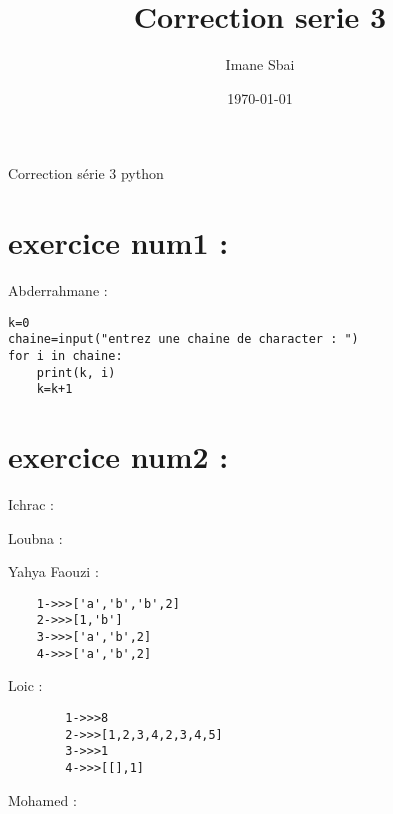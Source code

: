 \documentclass{article}
\title{Correction serie 3}
\author{Imane Sbai}
\date {\today}
\begin{document}
\begin{titlepage}
    \begin{center}
Correction s\'{e}rie 3 python
    \end{center}
\end{titlepage}

\section{exercice num1 :}
	\begin{center}
    		Abderrahmane :
	\end{center} 
	
\begin{lstlisting}
k=0
chaine=input("entrez une chaine de character : ")
for i in chaine:
	print(k, i)
	k=k+1
\end{lstlisting}
\section{exercice num2 :}

	\begin{center}
    		Ichrac :
	\end{center}
	
	\begin{lstlistings}

	\end{lstlistings}
	
	\begin{center}
    		Loubna :
	\end{center} 
	

        \begin{center}
    		 Yahya Faouzi :
	\end{center}    	  
        	
    \begin{lstlisting}
    1->>>['a','b','b',2]
    2->>>[1,'b']
    3->>>['a','b',2]
    4->>>['a','b',2]
    \end{lstlisting}
         
	\begin{center}
    		Loic :
	\end{center} 
	
	\begin{lstlisting}
		1->>>8
		2->>>[1,2,3,4,2,3,4,5]
		3->>>1
		4->>>[[],1]
	\end{lstlisting}
	
	\begin{center}
    		Mohamed :
	\end{center}
	
\end{document}

